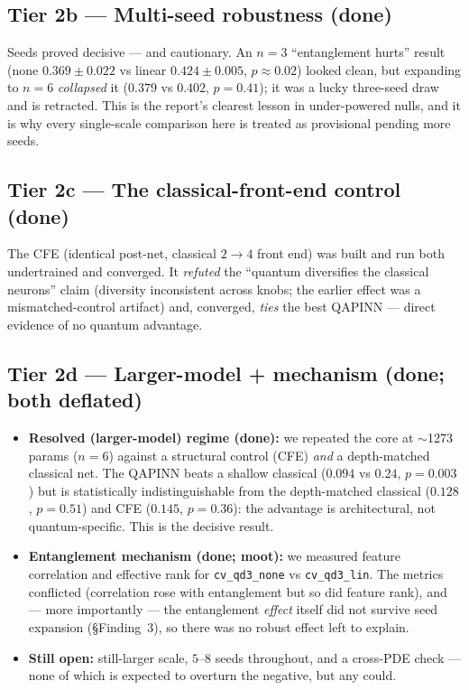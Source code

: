 \documentclass[11pt]{article}
\begin{document}
\subsection{Tier 2b --- Multi-seed robustness \textnormal{(\textbf{done})}}
Seeds proved decisive --- and cautionary. An $n=3$ ``entanglement hurts'' result
(none $0.369\pm0.022$ vs linear $0.424\pm0.005$, $p\approx0.02$) looked clean, but
expanding to $n=6$ \emph{collapsed} it ($0.379$ vs $0.402$, $p=0.41$); it was a lucky
three-seed draw and is retracted. This is the report's clearest lesson in
under-powered nulls, and it is why every single-scale comparison here is treated as
provisional pending more seeds.

\subsection{Tier 2c --- The classical-front-end control \textnormal{(\textbf{done})}}
The CFE (identical post-net, classical $2\!\to\!4$ front end) was built and run both
undertrained and converged. It \emph{refuted} the ``quantum diversifies the classical
neurons'' claim (diversity inconsistent across knobs; the earlier effect was a
mismatched-control artifact) and, converged, \emph{ties} the best QAPINN --- direct
evidence of no quantum advantage.

\subsection{Tier 2d --- Larger-model + mechanism \textnormal{(\textbf{done}; both deflated)}}
\begin{itemize}[nosep]
  \item \textbf{Resolved (larger-model) regime \textnormal{(done):}} we repeated the
  core at $\sim$1273 params ($n=6$) against a structural control (CFE) \emph{and} a
  depth-matched classical net. The QAPINN beats a shallow classical ($0.094$ vs
  $0.24$, $p=0.003$) but is statistically indistinguishable from the depth-matched classical ($0.128$, $p=0.51$) and CFE ($0.145$, $p=0.36$):
  the advantage is architectural, not quantum-specific. This is the decisive result.
  \item \textbf{Entanglement mechanism \textnormal{(done; moot):}} we measured feature
  correlation and effective rank for \texttt{cv\_qd3\_none} vs \texttt{cv\_qd3\_lin}.
  The metrics conflicted (correlation rose with entanglement but so did feature rank),
  and --- more importantly --- the entanglement \emph{effect} itself did not survive seed
  expansion (§Finding~3), so there was no robust effect left to explain.
  \item \textbf{Still open:} still-larger scale, $5$--$8$ seeds throughout, and a
  cross-PDE check --- none of which is expected to overturn the negative, but any could.
\end{itemize}
\end{document}
